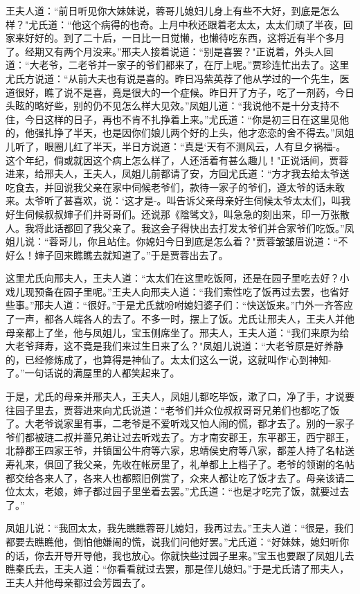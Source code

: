 王夫人道：“前日听见你大妹妹说，蓉哥儿媳妇儿身上有些不大好，到底是怎么样？"尤氏道：“他这个病得的也奇。上月中秋还跟着老太太，太太们顽了半夜，回家来好好的。到了二十后，一日比一日觉懒，也懒待吃东西，这将近有半个多月了。经期又有两个月没来。”邢夫人接着说道：“别是喜罢？"正说着，外头人回道：“大老爷，二老爷并一家子的爷们都来了，在厅上呢。”贾珍连忙出去了。这里尤氏方说道：“从前大夫也有说是喜的。昨日冯紫英荐了他从学过的一个先生，医道很好，瞧了说不是喜，竟是很大的一个症候。昨日开了方子，吃了一剂药，今日头眩的略好些，别的仍不见怎么样大见效。”凤姐儿道：“我说他不是十分支持不住，今日这样的日子，再也不肯不扎挣着上来。”尤氏道：“你是初三日在这里见他的，他强扎挣了半天，也是因你们娘儿两个好的上头，他才恋恋的舍不得去。”凤姐儿听了，眼圈儿红了半天，半日方说道：“真是`天有不测风云，人有旦夕祸福-。这个年纪，倘或就因这个病上怎么样了，人还活着有甚么趣儿！"正说话间，贾蓉进来，给邢夫人，王夫人，凤姐儿前都请了安，方回尤氏道：“方才我去给太爷送吃食去，并回说我父亲在家中伺候老爷们，款待一家子的爷们，遵太爷的话未敢来。太爷听了甚喜欢，说：`这才是-。叫告诉父亲母亲好生伺候太爷太太们，叫我好生伺候叔叔婶子们并哥哥们。还说那《陰骘文》，叫急急的刻出来，印一万张散人。我将此话都回了我父亲了。我这会子得快出去打发太爷们并合家爷们吃饭。”凤姐儿说：“蓉哥儿，你且站住。你媳妇今日到底是怎么着？"贾蓉皱皱眉说道：“不好么！婶子回来瞧瞧去就知道了。”于是贾蓉出去了。

这里尤氏向邢夫人，王夫人道：“太太们在这里吃饭阿，还是在园子里吃去好？小戏儿现预备在园子里呢。”王夫人向邢夫人道：“我们索性吃了饭再过去罢，也省好些事。”邢夫人道：“很好。”于是尤氏就吩咐媳妇婆子们：“快送饭来。”门外一齐答应了一声，都各人端各人的去了。不多一时，摆上了饭。尤氏让邢夫人，王夫人并他母亲都上了坐，他与凤姐儿，宝玉侧席坐了。邢夫人，王夫人道：“我们来原为给大老爷拜寿，这不竟是我们来过生日来了么？"凤姐儿说道：“大老爷原是好养静的，已经修炼成了，也算得是神仙了。太太们这么一说，这就叫作`心到神知-了。”一句话说的满屋里的人都笑起来了。

于是，尤氏的母亲并邢夫人，王夫人，凤姐儿都吃毕饭，漱了口，净了手，才说要往园子里去，贾蓉进来向尤氏说道：“老爷们并众位叔叔哥哥兄弟们也都吃了饭了。大老爷说家里有事，二老爷是不爱听戏又怕人闹的慌，都才去了。别的一家子爷们都被琏二叔并蔷兄弟让过去听戏去了。方才南安郡王，东平郡王，西宁郡王，北静郡王四家王爷，并镇国公牛府等六家，忠靖侯史府等八家，都差人持了名帖送寿礼来，俱回了我父亲，先收在帐房里了，礼单都上上档子了。老爷的领谢的名帖都交给各来人了，各来人也都照旧例赏了，众来人都让吃了饭才去了。母亲该请二位太太，老娘，婶子都过园子里坐着去罢。”尤氏道：“也是才吃完了饭，就要过去了。”

凤姐儿说：“我回太太，我先瞧瞧蓉哥儿媳妇，我再过去。”王夫人道：“很是，我们都要去瞧瞧他，倒怕他嫌闹的慌，说我们问他好罢。”尤氏道：“好妹妹，媳妇听你的话，你去开导开导他，我也放心。你就快些过园子里来。”宝玉也要跟了凤姐儿去瞧秦氏去，王夫人道：“你看看就过去罢，那是侄儿媳妇。”于是尤氏请了邢夫人，王夫人并他母亲都过会芳园去了。

